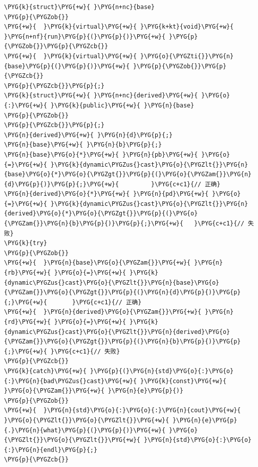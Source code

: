 \begin{itemize}
\begin{codeblockbg}
\begin{Verbatim}[commandchars=\\\{\},breaklines=true,breakanywhere=true,fontsize=\codefont,xleftmargin=17bp]
\PYG{k}{struct}\PYG{+w}{ }\PYG{n+nc}{base}
\PYG{p}{\PYGZob{}}
\PYG{+w}{  }\PYG{k}{virtual}\PYG{+w}{ }\PYG{k+kt}{void}\PYG{+w}{ }\PYG{n+nf}{run}\PYG{p}{(}\PYG{p}{)}\PYG{+w}{ }\PYG{p}{\PYGZob{}}\PYG{p}{\PYGZcb{}}
\PYG{+w}{  }\PYG{k}{virtual}\PYG{+w}{ }\PYG{o}{\PYGZti{}}\PYG{n}{base}\PYG{p}{(}\PYG{p}{)}\PYG{+w}{ }\PYG{p}{\PYGZob{}}\PYG{p}{\PYGZcb{}}
\PYG{p}{\PYGZcb{}}\PYG{p}{;}
\PYG{k}{struct}\PYG{+w}{ }\PYG{n+nc}{derived}\PYG{+w}{ }\PYG{o}{:}\PYG{+w}{ }\PYG{k}{public}\PYG{+w}{ }\PYG{n}{base}
\PYG{p}{\PYGZob{}}
\PYG{p}{\PYGZcb{}}\PYG{p}{;}
\PYG{n}{derived}\PYG{+w}{ }\PYG{n}{d}\PYG{p}{;}
\PYG{n}{base}\PYG{+w}{ }\PYG{n}{b}\PYG{p}{;}
\PYG{n}{base}\PYG{o}{*}\PYG{+w}{ }\PYG{n}{pb}\PYG{+w}{ }\PYG{o}{=}\PYG{+w}{ }\PYG{k}{dynamic\PYGZus{}cast}\PYG{o}{\PYGZlt{}}\PYG{n}{base}\PYG{o}{*}\PYG{o}{\PYGZgt{}}\PYG{p}{(}\PYG{o}{\PYGZam{}}\PYG{n}{d}\PYG{p}{)}\PYG{p}{;}\PYG{+w}{         }\PYG{c+c1}{// 正确}
\PYG{n}{derived}\PYG{o}{*}\PYG{+w}{ }\PYG{n}{pd}\PYG{+w}{ }\PYG{o}{=}\PYG{+w}{ }\PYG{k}{dynamic\PYGZus{}cast}\PYG{o}{\PYGZlt{}}\PYG{n}{derived}\PYG{o}{*}\PYG{o}{\PYGZgt{}}\PYG{p}{(}\PYG{o}{\PYGZam{}}\PYG{n}{b}\PYG{p}{)}\PYG{p}{;}\PYG{+w}{   }\PYG{c+c1}{// 失败}
\PYG{k}{try}
\PYG{p}{\PYGZob{}}
\PYG{+w}{  }\PYG{n}{base}\PYG{o}{\PYGZam{}}\PYG{+w}{ }\PYG{n}{rb}\PYG{+w}{ }\PYG{o}{=}\PYG{+w}{ }\PYG{k}{dynamic\PYGZus{}cast}\PYG{o}{\PYGZlt{}}\PYG{n}{base}\PYG{o}{\PYGZam{}}\PYG{o}{\PYGZgt{}}\PYG{p}{(}\PYG{n}{d}\PYG{p}{)}\PYG{p}{;}\PYG{+w}{       }\PYG{c+c1}{// 正确}
\PYG{+w}{  }\PYG{n}{derived}\PYG{o}{\PYGZam{}}\PYG{+w}{ }\PYG{n}{rd}\PYG{+w}{ }\PYG{o}{=}\PYG{+w}{ }\PYG{k}{dynamic\PYGZus{}cast}\PYG{o}{\PYGZlt{}}\PYG{n}{derived}\PYG{o}{\PYGZam{}}\PYG{o}{\PYGZgt{}}\PYG{p}{(}\PYG{n}{b}\PYG{p}{)}\PYG{p}{;}\PYG{+w}{ }\PYG{c+c1}{// 失败}
\PYG{p}{\PYGZcb{}}
\PYG{k}{catch}\PYG{+w}{ }\PYG{p}{(}\PYG{n}{std}\PYG{o}{:}\PYG{o}{:}\PYG{n}{bad\PYGZus{}cast}\PYG{+w}{ }\PYG{k}{const}\PYG{+w}{ }\PYG{o}{\PYGZam{}}\PYG{+w}{ }\PYG{n}{e}\PYG{p}{)}
\PYG{p}{\PYGZob{}}
\PYG{+w}{  }\PYG{n}{std}\PYG{o}{:}\PYG{o}{:}\PYG{n}{cout}\PYG{+w}{ }\PYG{o}{\PYGZlt{}}\PYG{o}{\PYGZlt{}}\PYG{+w}{ }\PYG{n}{e}\PYG{p}{.}\PYG{n}{what}\PYG{p}{(}\PYG{p}{)}\PYG{+w}{ }\PYG{o}{\PYGZlt{}}\PYG{o}{\PYGZlt{}}\PYG{+w}{ }\PYG{n}{std}\PYG{o}{:}\PYG{o}{:}\PYG{n}{endl}\PYG{p}{;}
\PYG{p}{\PYGZcb{}}
\end{Verbatim}
\end{codeblockbg}



\end{itemize}
